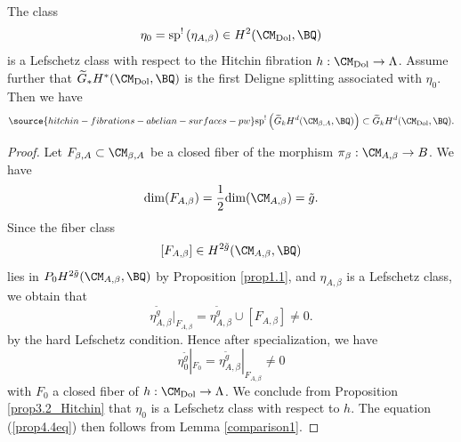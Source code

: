 \begin{prop}
\notready\label{prop4.4}
The class
\[
\eta_0 = \mathrm{sp}^!\left( \eta_{A,\beta}\right) \in H^2(\CM_{\mathrm{Dol}}, \BQ)
\]
is a Lefschetz class with respect to the Hitchin fibration $h: \CM_{\mathrm{Dol}} \to \Lambda$. Assume further that $\widetilde{G}_\ast H^*(\CM_{\mathrm{Dol}}, \BQ)$ is the first Deligne splitting associated with $\eta_0$. Then we have
\begin{equation}\label{prop4.4eq}
\source{hitchin-fibrations-abelian-surfaces-pw}
\mathrm{sp}^!\left( \widetilde{G}_kH^d(\CM_{\beta,A}, \BQ) \right) \subset \widetilde{G}_k H^d(\CM_{\mathrm{Dol}}, \BQ).
\end{equation}
\end{prop}


\begin{proof}
Let $F_{\beta,A} \subset \CM_{\beta,A}$ be a closed fiber of the morphism $\pi_\beta: \CM_{A,\beta} \to B$. We have
\[
 \mathrm{dim}(F_{A,\beta})= \frac{1}{2}\mathrm{dim}(\CM_{A,\beta}) = \tilde{g}.
\]
Since the fiber class
\[
[F_{A,\beta}] \in H^{2\tilde{g}}(\CM_{A,\beta}, \BQ)
\]
lies in $P_0H^{2\tilde{g}}(\CM_{A,\beta}, \BQ)$ by Proposition \ref{prop1.1}, and $\eta_{A,\beta}$ is a Lefschetz class, we obtain that
\[
\eta_{A,\beta}^{\tilde{g}}|_{F_{A,\beta}} = \eta_{A,\beta}^{\tilde{g}} \cup [F_{A,\beta}] \neq 0.
\]
by the hard Lefschetz condition. Hence after specialization, we have
\[
\eta_0^{\tilde{g}}|_{F_0} = \eta_{A,\beta}^{\tilde{g}}|_{F_{A,\beta}} \neq 0
\]
with $F_0$ a closed fiber of $h: \CM_{\mathrm{Dol}} \to \Lambda$. We conclude from Proposition \ref{prop3.2_Hitchin} that $\eta_0$ is a Lefschetz class with respect to $h$. The equation (\ref{prop4.4eq}) then follows from Lemma \ref{comparison1}.
\end{proof}


